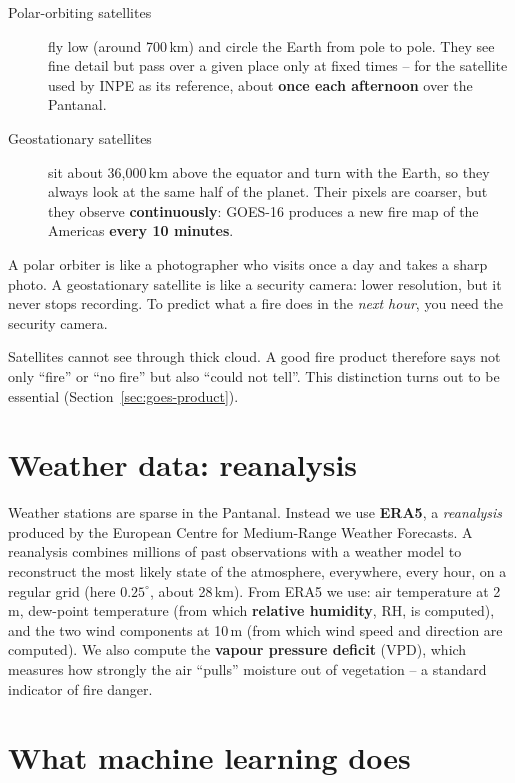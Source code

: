 \documentclass[11pt,a4paper,oneside]{report}
\begin{document}
\begin{description}
  \item[Polar-orbiting satellites] fly low (around 700\,km) and circle the Earth
        from pole to pole. They see fine detail but pass over a given place only
        at fixed times -- for the satellite used by INPE as its reference, about
        \textbf{once each afternoon} over the Pantanal.
  \item[Geostationary satellites] sit about 36{,}000\,km above the equator and
        turn with the Earth, so they always look at the same half of the planet.
        Their pixels are coarser, but they observe \textbf{continuously}: GOES-16
        produces a new fire map of the Americas \textbf{every 10 minutes}.
\end{description}

\begin{plainbox}
A polar orbiter is like a photographer who visits once a day and takes a sharp
photo. A geostationary satellite is like a security camera: lower resolution, but
it never stops recording. To predict what a fire does in the \emph{next hour},
you need the security camera.
\end{plainbox}

Satellites cannot see through thick cloud. A good fire product therefore says not
only \enquote{fire} or \enquote{no fire} but also \enquote{could not tell}. This
distinction turns out to be essential (Section~\ref{sec:goes-product}).

\section{Weather data: reanalysis}

Weather stations are sparse in the Pantanal. Instead we use \textbf{ERA5}, a
\emph{reanalysis} produced by the European Centre for Medium-Range Weather
Forecasts. A reanalysis combines millions of past observations with a weather
model to reconstruct the most likely state of the atmosphere, everywhere, every
hour, on a regular grid (here $0.25^\circ$, about 28\,km). From ERA5 we use:
air temperature at 2\,m, dew-point temperature (from which \textbf{relative
humidity}, RH, is computed), and the two wind components at 10\,m (from which
wind speed and direction are computed). We also compute the \textbf{vapour
pressure deficit} (VPD), which measures how strongly the air \enquote{pulls}
moisture out of vegetation -- a standard indicator of fire danger.

\section{What machine learning does}
\end{document}
